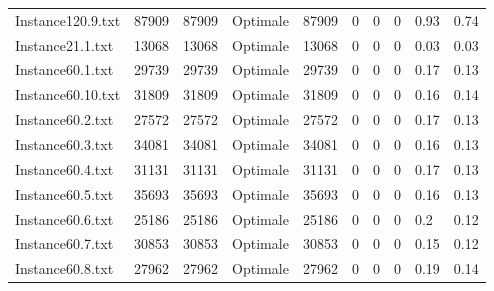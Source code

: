 \documentclass[a4paper,12pt]{article}
\theoremstyle{blueDefinition}
\theoremstyle{redProperty}
\begin{document}
\begin{table}[htbp]
\begin{tabular}{|l|p{40pt}|p{40pt}|p{55pt}|p{45pt}|p{35pt}|p{35pt}|p{35pt}|p{35pt}|p{35pt}|}
Instance120.9.txt  & 87909            & 87909               & Optimale                   & 87909              & 0          & 0                & 0                    & 0.93             & 0.74                 \\
Instance21.1.txt   & 13068            & 13068               & Optimale                   & 13068              & 0          & 0                & 0                    & 0.03             & 0.03                 \\
Instance60.1.txt   & 29739            & 29739               & Optimale                   & 29739              & 0          & 0                & 0                    & 0.17             & 0.13                 \\
Instance60.10.txt  & 31809            & 31809               & Optimale                   & 31809              & 0          & 0                & 0                    & 0.16             & 0.14                 \\
Instance60.2.txt   & 27572            & 27572               & Optimale                   & 27572              & 0          & 0                & 0                    & 0.17             & 0.13                 \\
Instance60.3.txt   & 34081            & 34081               & Optimale                   & 34081              & 0          & 0                & 0                    & 0.16             & 0.13                 \\
Instance60.4.txt   & 31131            & 31131               & Optimale                   & 31131              & 0          & 0                & 0                    & 0.17             & 0.13                 \\
Instance60.5.txt   & 35693            & 35693               & Optimale                   & 35693              & 0          & 0                & 0                    & 0.16             & 0.13                 \\
Instance60.6.txt   & 25186            & 25186               & Optimale                   & 25186              & 0          & 0                & 0                    & 0.2              & 0.12                 \\
Instance60.7.txt   & 30853            & 30853               & Optimale                   & 30853              & 0          & 0                & 0                    & 0.15             & 0.12                 \\
Instance60.8.txt   & 27962            & 27962               & Optimale                   & 27962              & 0          & 0                & 0                    & 0.19             & 0.14                 \\

\end{tabular}
\end{table}
\end{document}
